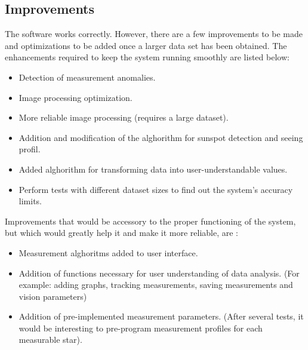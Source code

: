 \subsection{Improvements}
The software works correctly. However, there are a few improvements to be made and optimizations to be added once
a larger data set has been obtained. \newline
The enhancements required to keep the system running smoothly are listed below:
\begin{itemize}
    \item Detection of measurement anomalies.
    \item Image processing optimization.
    \item More reliable image processing (requires a large dataset).
    \item Addition and modification of the alghorithm for sunspot detection and seeing profil.
    \item Added alghorithm for transforming data into user-understandable values.
    \item Perform tests with different dataset sizes to find out the system's accuracy limits.
\end{itemize}
Improvements that would be accessory to the proper functioning of the system, but which would greatly help it and make it more reliable, are :
\begin{itemize}
    \item Measurement alghoritms added to user interface.
    \item Addition of functions necessary for user understanding of data analysis.
          (For example: adding graphs, tracking measurements, saving measurements and vision parameters)
    \item Addition of pre-implemented measurement parameters.
          (After several tests, it would be interesting to pre-program measurement profiles for each measurable star).
\end{itemize}